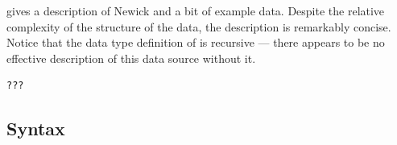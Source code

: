 \documentclass{entcs}
\begin{document}
 gives a description of Newick
and a bit of example data.
Despite the relative complexity of the structure of the data, 
the description is remarkably concise.
Notice that the data type definition of  is recursive ---
there appears to be no effective description of this data
source without it.  



\begin{verbatim}
???
\end{verbatim}

\subsection{Syntax}
\end{document}
